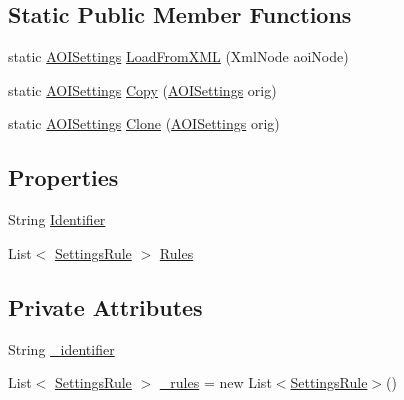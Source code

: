 \subsection*{Static Public Member Functions}
\begin{DoxyCompactItemize}
\item 
static \hyperlink{class_web_analyzer_1_1_models_1_1_settings_model_1_1_a_o_i_settings}{A\+O\+I\+Settings} \hyperlink{class_web_analyzer_1_1_models_1_1_settings_model_1_1_a_o_i_settings_ae2ef2eeabecd6cd2dbb8427370fa4ff0}{Load\+From\+X\+M\+L} (Xml\+Node aoi\+Node)
\item 
static \hyperlink{class_web_analyzer_1_1_models_1_1_settings_model_1_1_a_o_i_settings}{A\+O\+I\+Settings} \hyperlink{class_web_analyzer_1_1_models_1_1_settings_model_1_1_a_o_i_settings_a85c137ff1741cbd292804cb3ec94eca3}{Copy} (\hyperlink{class_web_analyzer_1_1_models_1_1_settings_model_1_1_a_o_i_settings}{A\+O\+I\+Settings} orig)
\item 
static \hyperlink{class_web_analyzer_1_1_models_1_1_settings_model_1_1_a_o_i_settings}{A\+O\+I\+Settings} \hyperlink{class_web_analyzer_1_1_models_1_1_settings_model_1_1_a_o_i_settings_acf226641c18208967b6e193503bf1883}{Clone} (\hyperlink{class_web_analyzer_1_1_models_1_1_settings_model_1_1_a_o_i_settings}{A\+O\+I\+Settings} orig)
\end{DoxyCompactItemize}
\subsection*{Properties}
\begin{DoxyCompactItemize}
\item 
String \hyperlink{class_web_analyzer_1_1_models_1_1_settings_model_1_1_a_o_i_settings_a6fee5ecaba688289bfd5795367250339}{Identifier}
\item 
List$<$ \hyperlink{class_web_analyzer_1_1_models_1_1_settings_model_1_1_settings_rule}{Settings\+Rule} $>$ \hyperlink{class_web_analyzer_1_1_models_1_1_settings_model_1_1_a_o_i_settings_a8852191a79accfc1288d0fb6a2b4a14c}{Rules}
\end{DoxyCompactItemize}
\subsection*{Private Attributes}
\begin{DoxyCompactItemize}
\item 
String \hyperlink{class_web_analyzer_1_1_models_1_1_settings_model_1_1_a_o_i_settings_aaad4690527bd5ad5075cd87df38b249e}{\+\_\+identifier}
\item 
List$<$ \hyperlink{class_web_analyzer_1_1_models_1_1_settings_model_1_1_settings_rule}{Settings\+Rule} $>$ \hyperlink{class_web_analyzer_1_1_models_1_1_settings_model_1_1_a_o_i_settings_a36ff6cc7414c41d4b619b3101977ff4c}{\+\_\+rules} = new List$<$\hyperlink{class_web_analyzer_1_1_models_1_1_settings_model_1_1_settings_rule}{Settings\+Rule}$>$()
\end{DoxyCompactItemize}


